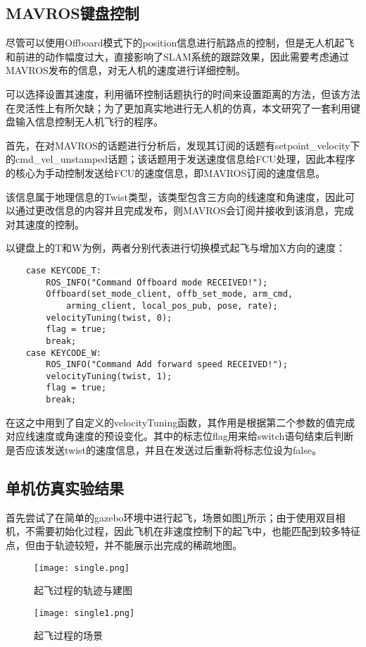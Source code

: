 \subsection{MAVROS键盘控制} \label{4.2.4}

尽管可以使用Offboard模式下的position信息进行航路点的控制，但是无人机起飞和前进的动作幅度过大，直接影响了SLAM系统的跟踪效果，因此需要考虑通过MAVROS发布的信息，对无人机的速度进行详细控制。

可以选择设置其速度，利用循环控制话题执行的时间来设置距离的方法，但该方法在灵活性上有所欠缺；为了更加真实地进行无人机的仿真，本文研究了一套利用键盘输入信息控制无人机飞行的程序。

首先，在对MAVROS的话题进行分析后，发现其订阅的话题有setpoint\_velocity下的cmd\_vel\_unstamped话题；该话题用于发送速度信息给FCU处理，因此本程序的核心为手动控制发送给FCU的速度信息，即MAVROS订阅的速度信息。

该信息属于地理信息的Twist类型，该类型包含三方向的线速度和角速度，因此可以通过更改信息的内容并且完成发布，则MAVROS会订阅并接收到该消息，完成对其速度的控制。

以键盘上的T和W为例，两者分别代表进行切换模式起飞与增加X方向的速度：

\begin{verbatim}
    case KEYCODE_T:
        ROS_INFO("Command Offboard mode RECEIVED!");
        Offboard(set_mode_client, offb_set_mode, arm_cmd,
            arming_client, local_pos_pub, pose, rate);
        velocityTuning(twist, 0);
        flag = true;
        break;
    case KEYCODE_W:
        ROS_INFO("Command Add forward speed RECEIVED!");
        velocityTuning(twist, 1);
        flag = true;
        break;
\end{verbatim}

在这之中用到了自定义的velocityTuning函数，其作用是根据第二个参数的值完成对应线速度或角速度的预设变化。其中的标志位flag用来给switch语句结束后判断是否应该发送twist的速度信息，并且在发送过后重新将标志位设为false。

\subsection{单机仿真实验结果} \label{4.2.5}

首先尝试了在简单的gazebo环境中进行起飞，场景如图\ref{fig4-6-1}所示；由于使用双目相机，不需要初始化过程，因此飞机在非速度控制下的起飞中，也能匹配到较多特征点，但由于轨迹较短，并不能展示出完成的稀疏地图。

\begin{figure}[htbp]
	\centering
	\begin{minipage}[t]{0.45\columnwidth} %
		\centering
		\texttt{[image: single.png]}
		\caption{起飞过程的轨迹与建图}
		\label{fig4-6}
	\end{minipage}
	\begin{minipage}[t]{0.45\columnwidth}
		\centering
		\texttt{[image: single1.png]}
		\caption{起飞过程的场景}
		\label{fig4-6-1}
	\end{minipage}
\end{figure}

